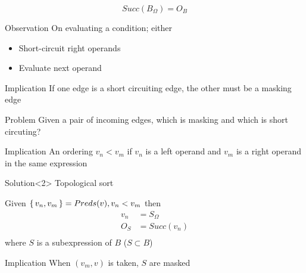 \documentclass[xcolor = {dvipsnames, table}]{beamer}
\begin{document}
\begin{frame}
    \begin{equation*}
        Succ(B_\Omega) = O_B
    \end{equation*}

    \begin{block}{Observation}
        On evaluating a condition; either
        \begin{itemize}
            \item Short-circuit right operands
            \item Evaluate next operand
        \end{itemize}
    \end{block}

    \begin{block}{Implication}
        If one edge is a short circuiting edge, the other must be a masking
        edge
    \end{block}
\end{frame}

\begin{frame}
    \begin{block}{Problem}
        Given a pair of incoming edges, which is masking and which is short
        circuting?
    \end{block}

    \begin{block}{Implication}
        An ordering $v_n < v_m$ if $v_n$ is a left operand and $v_m$ is
        a right operand in the same expression
    \end{block}

    \begin{block}{Solution}<2>
        Topological sort
    \end{block}
\end{frame}

\begin{frame}
    Given $\set{v_n, v_m} = Preds(v), v_n < v_m$ then
    \begin{align*}
        v_n &= S_\Omega \\
        O_S &= Succ(v_n) \\
    \end{align*}
    where $S$ is a subexpression of $B$ ($S \subset B$)

    \begin{block}{Implication}
        When $(v_m, v)$ is taken, $S$ are masked
    \end{block}
\end{frame}
\end{document}
